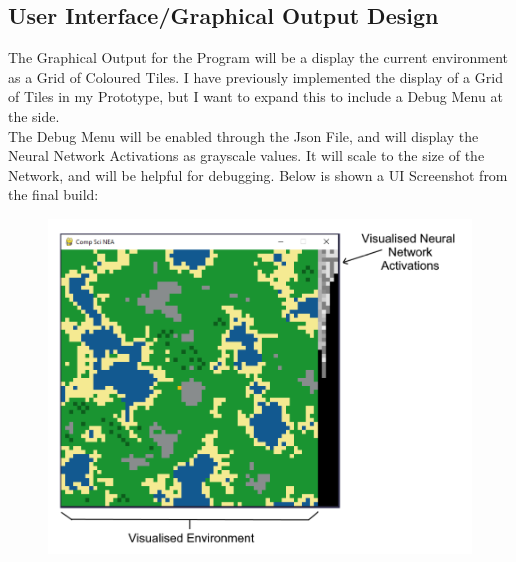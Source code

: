 \begin{flushleft}
        \subsection{User Interface/Graphical Output Design}
            The Graphical Output for the Program will be a display the current environment as a Grid of Coloured Tiles. I have previously
            implemented the display of a Grid of Tiles in my Prototype, but I want to expand this to include a Debug Menu at the side.\\
            \vspace{0.2cm}
            The Debug Menu will be enabled through the Json File, and will display the Neural Network Activations as grayscale values. 
            It will scale to the size of the Network, and will be helpful for debugging. Below is shown a UI Screenshot from the final
            build: \\

            \begin{figure}[H]
                \centering
                \includegraphics[width=14cm]{Images/Design/AnnotatedUIExample.PNG}
            \end{figure}

\end{flushleft}
